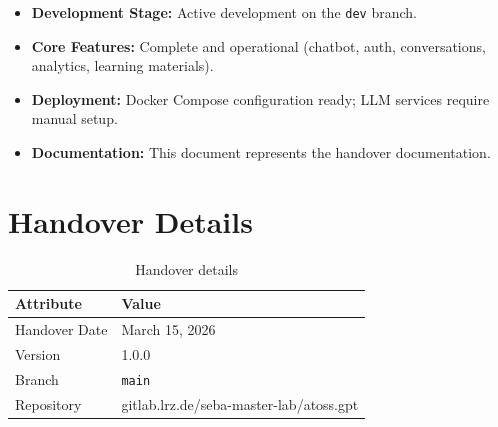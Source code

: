 \documentclass[a4paper,12pt]{report}
\begin{document}
\begin{itemize}
    \item \textbf{Development Stage:} Active development on the \texttt{dev} branch.
    \item \textbf{Core Features:} Complete and operational (chatbot, auth, conversations, analytics, learning materials).
    \item \textbf{Deployment:} Docker Compose configuration ready; LLM services require manual setup.
    \item \textbf{Documentation:} This document represents the handover documentation.
\end{itemize}

\section{Handover Details}

\begin{table}[H]
\centering
\begin{tabularx}{0.7\textwidth}{lX}
    \toprule
    \textbf{Attribute} & \textbf{Value} \\
    \midrule
    Handover Date & March 15, 2026 \\
    Version & 1.0.0 \\
    Branch & \texttt{main} \\
    Repository & gitlab.lrz.de/seba-master-lab/atoss.gpt \\
    \bottomrule
\end{tabularx}
\caption{Handover details}
\end{table}
\end{document}
